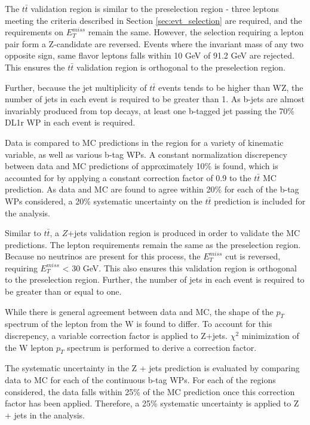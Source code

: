 The $t\bar{t}$ validation region is similar to the preselection region - three leptons meeting the criteria described in Section \ref{sec:evt_selection} are required, and the requirements on $E_T^{miss}$ remain the same. However, the selection requiring a lepton pair form a Z-candidate are reversed. Events where the invariant mass of any two opposite sign, same flavor leptons falls within 10 GeV of 91.2 GeV are rejected. This ensures the $t\bar{t}$ validation region is orthogonal to the preselection region. 

Further, because the jet multiplicity of $t\bar{t}$ events tends to be higher than WZ, the number of jets in each event is required to be greater than 1. As b-jets are almost invariably produced from top decays, at least one b-tagged jet passing the 70\% DL1r WP in each event is required. 

Data is compared to MC predictions in the region for a variety of kinematic variable, as well as various b-tag WPs. A constant normalization discrepency between data and MC predictions of approximately 10\% is found, which is accounted for by applying a constant correction factor of 0.9 to the $t\bar{t}$ MC prediction. As data and MC are found to agree within 20\% for each of the b-tag WPs considered, a 20\% systematic uncertainty on the $t\bar{t}$ prediction is included for the analysis.

Similar to $t\bar{t}$, a $Z$+jets validation region is produced in order to validate the MC predictions. The lepton requirements remain the same as the preselection region. Because no neutrinos are present for this process, the $E_T^{miss}$ cut is reversed, requiring $E_T^{miss}$ < 30 GeV. This also ensures this validation region is orthogonal to the preselection region. Further, the number of jets in each event is required to be greater than or equal to one.

While there is general agreement between data and MC, the shape of the $p_T$ spectrum of the lepton from the W is found to differ. To account for this discrepency, a variable correction factor is applied to Z+jets. $\chi^2$ minimization of the W lepton $p_T$ spectrum is performed to derive a correction factor.

The systematic uncertainty in the Z + jets prediction is evaluated by comparing data to MC for each of the continuous b-tag WPs. For each of the regions considered, the data falls within 25\% of the MC prediction once this correction factor has been applied. Therefore, a 25\% systematic uncertainty is applied to Z + jets in the analysis.

